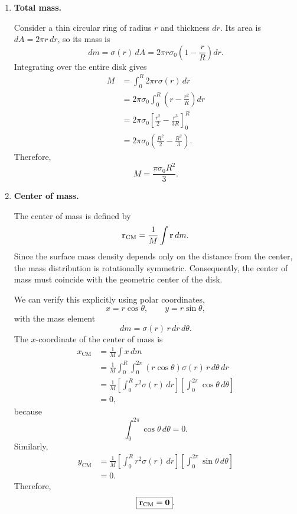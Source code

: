 \documentclass[12pt]{article}
\begin{document}
\begin{enumerate}
    \item \textbf{Total mass.}

    Consider a thin circular ring of radius $r$ and thickness $dr$.
    Its area is $dA=2\pi r\,dr$, so its mass is
    \[
        dm=\sigma(r)\,dA
        =2\pi r\sigma_0\left(1-\frac{r}{R}\right)dr.
    \]
    Integrating over the entire disk gives
    \begin{align*}
        M
        &=\int_0^R 2\pi r\sigma(r)\,dr\\
        &=2\pi\sigma_0\int_0^R
        \left(r-\frac{r^2}{R}\right)dr\\
        &=2\pi\sigma_0
        \left[\frac{r^2}{2}-\frac{r^3}{3R}\right]_0^R\\
        &=2\pi\sigma_0
        \left(\frac{R^2}{2}-\frac{R^2}{3}\right).
    \end{align*}
    Therefore,
    \[
        \boxed{M=\frac{\pi\sigma_0R^2}{3}}.
    \]

    \item \textbf{Center of mass.}

    The center of mass is defined by
    \[
        \vb{r}_{\mathrm{CM}}
        =\frac{1}{M}\int\vb{r}\,dm.
    \]
    Since the surface mass density depends only on the distance
    from the center, the mass distribution is rotationally
    symmetric. Consequently, the center of mass must coincide
    with the geometric center of the disk.

    We can verify this explicitly using polar coordinates,
    \[
        x=r\cos\theta,\qquad y=r\sin\theta,
    \]
    with the mass element
    \[
        dm=\sigma(r)\,r\,dr\,d\theta.
    \]
    The $x$-coordinate of the center of mass is
    \begin{align*}
        x_{\mathrm{CM}}
        &=\frac{1}{M}\int x\,dm\\
        &=\frac{1}{M}\int_0^R\int_0^{2\pi}
        (r\cos\theta)\sigma(r)\,r\,d\theta\,dr\\
        &=\frac{1}{M}
        \left[\int_0^R r^2\sigma(r)\,dr\right]
        \left[\int_0^{2\pi}\cos\theta\,d\theta\right]\\
        &=0,
    \end{align*}
    because
    \[
        \int_0^{2\pi}\cos\theta\,d\theta=0.
    \]
    Similarly,
    \begin{align*}
        y_{\mathrm{CM}}
        &=\frac{1}{M}
        \left[\int_0^R r^2\sigma(r)\,dr\right]
        \left[\int_0^{2\pi}\sin\theta\,d\theta\right]\\
        &=0.
    \end{align*}
    Therefore,
    \[
        \boxed{\vb{r}_{\mathrm{CM}}=\vb{0}}.
    \]


\end{enumerate}
\end{document}
